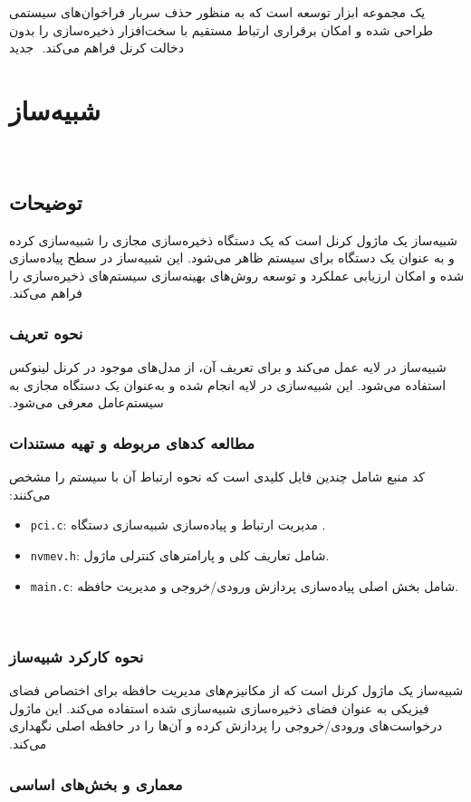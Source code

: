 ‫ یک مجموعه ابزار توسعه است که به منظور حذف سربار فراخوان‌های سیستمی طراحی شده و امکان برقراری ارتباط مستقیم با سخت‌افزار ذخیره‌سازی را بدون دخالت کرنل فراهم می‌کند.
‫
‫‌جدید
‫
‫\section{شبیه‌ساز }
‫
‫\subsection*{توضیحات}
‫شبیه‌ساز  یک ماژول کرنل است که یک دستگاه ذخیره‌سازی مجازی را شبیه‌سازی کرده و به عنوان یک دستگاه  برای سیستم ظاهر می‌شود. این شبیه‌ساز در سطح  پیاده‌سازی شده و امکان ارزیابی عملکرد و توسعه روش‌های بهینه‌سازی سیستم‌های ذخیره‌سازی را فراهم می‌کند.
‫
‫\subsubsection*{نحوه تعریف }
‫شبیه‌ساز  در لایه  عمل می‌کند و برای تعریف آن، از مدل‌های  موجود در کرنل لینوکس استفاده می‌شود. این شبیه‌سازی در لایه  انجام شده و به‌عنوان یک دستگاه مجازی به سیستم‌عامل معرفی می‌شود.
‫
‫\subsubsection*{مطالعه کدهای مربوطه و تهیه مستندات}
‫کد منبع  شامل چندین فایل کلیدی است که نحوه ارتباط آن با سیستم را مشخص می‌کنند:
‫\begin{itemize}
‫	\item \texttt{pci.c}: مدیریت ارتباط  و پیاده‌سازی شبیه‌سازی دستگاه .
‫	\item \texttt{nvmev.h}: شامل تعاریف کلی و پارامترهای کنترلی ماژول.
‫	\item \texttt{main.c}: شامل بخش اصلی پیاده‌سازی پردازش ورودی/خروجی و مدیریت حافظه.
‫\end{itemize}
‫
‫\subsubsection*{نحوه کارکرد شبیه‌ساز}
‫شبیه‌ساز  یک ماژول کرنل است که از مکانیزم‌های مدیریت حافظه برای اختصاص فضای فیزیکی به عنوان فضای ذخیره‌سازی شبیه‌سازی شده استفاده می‌کند. این ماژول درخواست‌های ورودی/خروجی را پردازش کرده و آن‌ها را در حافظه اصلی نگهداری می‌کند.
‫
‫\subsubsection*{معماری و بخش‌های اساسی}
